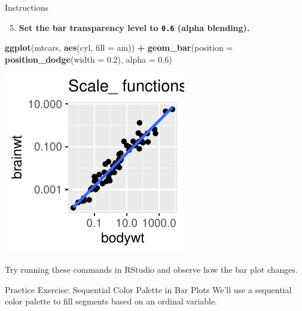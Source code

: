 \documentclass[
  ignorenonframetext,
]{beamer}
\newenvironment{Shaded}{\begin{snugshade}}{\end{snugshade}}
\newcommand{\AttributeTok}[1]{\textcolor[rgb]{0.13,0.29,0.53}{#1}}
\newcommand{\FloatTok}[1]{\textcolor[rgb]{0.00,0.00,0.81}{#1}}
\newcommand{\FunctionTok}[1]{\textcolor[rgb]{0.13,0.29,0.53}{\textbf{#1}}}
\newcommand{\NormalTok}[1]{#1}
\newcommand{\SpecialCharTok}[1]{\textcolor[rgb]{0.81,0.36,0.00}{\textbf{#1}}}
\providecommand{\tightlist}{%
  \setlength{\itemsep}{0pt}\setlength{\parskip}{0pt}}
\begin{document}
\begin{frame}[fragile]{Instructions}
\label{instructions-7}
\begin{enumerate}
\setcounter{enumi}{4}
\tightlist
\item
  \textbf{Set the bar transparency level to \texttt{0.6} (alpha
  blending).}
\end{enumerate}


\begin{Shaded}
\begin{Highlighting}[]
\FunctionTok{ggplot}\NormalTok{(mtcars, }\FunctionTok{aes}\NormalTok{(cyl, }\AttributeTok{fill =}\NormalTok{ am)) }\SpecialCharTok{+} \FunctionTok{geom\_bar}\NormalTok{(}\AttributeTok{position =} \FunctionTok{position\_dodge}\NormalTok{(}\AttributeTok{width =} \FloatTok{0.2}\NormalTok{),}
    \AttributeTok{alpha =} \FloatTok{0.6}\NormalTok{)}
\end{Highlighting}
\end{Shaded}

\begin{center}\includegraphics[width=0.5\linewidth]{Figs/unnamed-chunk-51-1} \end{center}

Try running these commands in RStudio and observe how the bar plot
changes.
\end{frame}

\begin{frame}{Practice Exercise: Sequential Color Palette in Bar Plots}
\label{practice-exercise-sequential-color-palette-in-bar-plots}
We'll use a sequential color palette to fill segments based on an
ordinal variable.
\end{frame}
\end{document}
